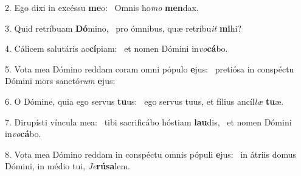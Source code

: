 2. Ego dixi in excéssu \textbf{me}o: \ast\  Omnis ho\textit{mo} \textbf{men}dax.\

3. Quid retríbuam \textbf{Dó}mino, \ast\  pro ómnibus, quæ retríbu\textit{it} \textbf{mi}hi?\

4. Cálicem salutáris ac\textbf{cí}piam: \ast\  et nomen Dómini in\textit{vo}\textbf{cá}bo.\

5. Vota mea Dómino reddam coram omni pópulo \textbf{e}jus: \ast\  pretiósa in conspéctu Dómini mors sanctó\textit{rum} \textbf{e}jus:\

6. O Dómine, quia ego servus \textbf{tu}us: \ast\  ego servus tuus, et fílius ancíl\textit{læ} \textbf{tu}æ.\

7. Dirupísti víncula mea: \dag\  tibi sacrificábo hóstiam \textbf{lau}dis, \ast\  et nomen Dómini in\textit{vo}\textbf{cá}bo.\

8. Vota mea Dómino reddam in conspéctu omnis pópuli \textbf{e}jus: \ast\  in átriis domus Dómini, in médio tui, \textit{Je}\textbf{rú}\textbf{sa}lem.\

